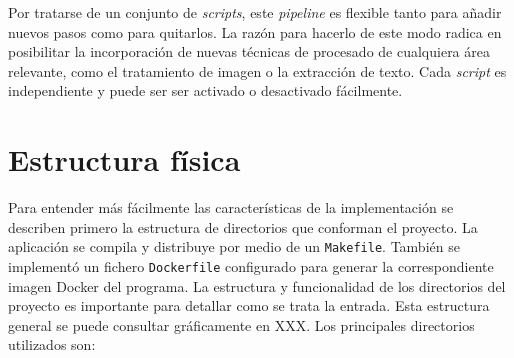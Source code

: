 Por tratarse de un conjunto de \emph{scripts}, este \emph{pipeline} es flexible tanto para añadir nuevos pasos como para quitarlos. La razón para hacerlo de este modo radica en posibilitar la incorporación de nuevas técnicas de procesado de cualquiera área relevante, como el tratamiento de imagen o la extracción de texto. Cada \emph{script} es independiente y puede ser ser activado o desactivado fácilmente.










\section{Estructura física}

Para entender más fácilmente las características de la implementación se describen primero la estructura de directorios que conforman el proyecto. La aplicación se compila y distribuye por medio de un \verb|Makefile|. También se implementó un fichero \verb|Dockerfile| configurado para generar la correspondiente imagen Docker del programa. 
La estructura y funcionalidad de los directorios del proyecto es importante para detallar como se trata la entrada. Esta estructura general se puede consultar gráficamente en XXX. Los principales directorios utilizados son:

